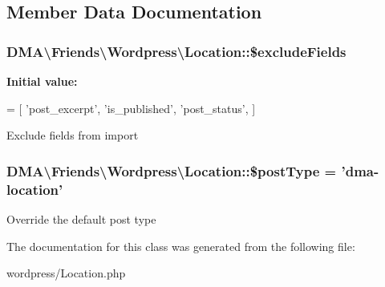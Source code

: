 \subsection{Member Data Documentation}
\hypertarget{classDMA_1_1Friends_1_1Wordpress_1_1Location_ae18a475210d12a42d335d6ca6fb47811}{
\subsubsection[{\$exclude\-Fields}]{\setlength{\rightskip}{0pt plus 5cm}D\-M\-A\textbackslash{}\-Friends\textbackslash{}\-Wordpress\textbackslash{}\-Location\-::\$exclude\-Fields\hspace{0.3cm}{\ttfamily [protected]}}}\label{classDMA_1_1Friends_1_1Wordpress_1_1Location_ae18a475210d12a42d335d6ca6fb47811}
{\bfseries Initial value\-:}
\begin{DoxyCode}
= [
        \textcolor{stringliteral}{'post\_excerpt'},
        \textcolor{stringliteral}{'is\_published'},
        \textcolor{stringliteral}{'post\_status'},
    ]
\end{DoxyCode}
Exclude fields from import \hypertarget{classDMA_1_1Friends_1_1Wordpress_1_1Location_a40f4ecf15a53d860bfbba3484f2999bf}{
\subsubsection[{\$post\-Type}]{\setlength{\rightskip}{0pt plus 5cm}D\-M\-A\textbackslash{}\-Friends\textbackslash{}\-Wordpress\textbackslash{}\-Location\-::\$post\-Type = 'dma-\/location'}}\label{classDMA_1_1Friends_1_1Wordpress_1_1Location_a40f4ecf15a53d860bfbba3484f2999bf}
Override the default post type 

The documentation for this class was generated from the following file\-:\begin{DoxyCompactItemize}
\item 
wordpress/Location.\-php\end{DoxyCompactItemize}
